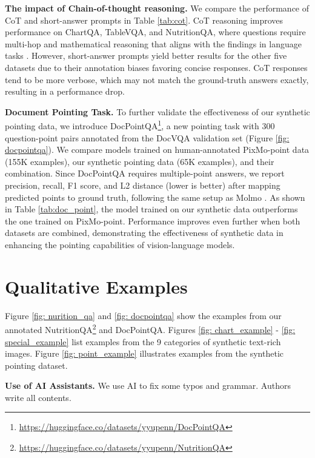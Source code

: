 \smallbreak
\noindent \textbf{The impact of Chain-of-thought reasoning.} We compare the performance of CoT and short-answer prompts in Table \ref{tab:cot}.
CoT reasoning improves performance on ChartQA, TableVQA, and NutritionQA, where questions require multi-hop and mathematical reasoning that aligns with the findings in language tasks \cite{sprague2024cot}.
However, short-answer prompts yield better results for the other five datasets due to their annotation biases favoring concise responses. 
CoT responses tend to be more verbose, which may not match the ground-truth answers exactly, resulting in a performance drop.

\smallbreak
\noindent \textbf{Document Pointing Task.} To further validate the effectiveness of our synthetic pointing data, we introduce DocPointQA\footnote{\href{https://huggingface.co/datasets/yyupenn/DocPointQA}{https://huggingface.co/datasets/yyupenn/DocPointQA}}, a new pointing task with 300 question-point pairs annotated from the DocVQA validation set (Figure \ref{fig: docpointqa}).
We compare models trained on human-annotated PixMo-point data (155K examples), our synthetic pointing data (65K examples), and their combination. 
Since DocPointQA requires multiple-point answers, we report precision, recall, F1 score, and L2 distance (lower is better) after mapping predicted points to ground truth, following the same setup as Molmo \cite{deitke2024molmo}.
As shown in Table \ref{tab:doc_point}, the model trained on our synthetic data outperforms the one trained on PixMo-point. 
Performance improves even further when both datasets are combined, demonstrating the effectiveness of synthetic data in enhancing the pointing capabilities of vision-language models.



\section{Qualitative Examples} \label{appendix: example}
Figure \ref{fig: nurition_qa} and \ref{fig: docpointqa} show the examples from our annotated NutritionQA\footnote{\href{https://huggingface.co/datasets/yyupenn/NutritionQA}{https://huggingface.co/datasets/yyupenn/NutritionQA}} and DocPointQA. 
Figures \ref{fig: chart_example} - \ref{fig: special_example} list examples from the 9 categories of synthetic text-rich images. Figure \ref{fig: point_example} illustrates examples from the synthetic pointing dataset.

\bigbreak
\noindent \textbf{Use of AI Assistants.} We use AI to fix some typos and grammar. Authors write all contents.

